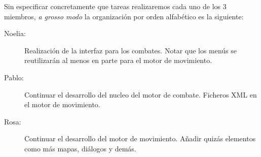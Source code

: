 \documentclass[a4paper,10pt]{article}
\begin{document}
\noindent Sin especificar concretamente que tareas realizaremos cada uno de
los 3 miembros, \textit{a grosso modo} la organización por orden alfabético
es la siguiente:

\begin{description}
\item[Noelia: ] Realización de la interfaz para los combates. Notar que
  los menús se reutilizarán al menos en parte para el motor de movimiento.
\item[Pablo: ] Continuar el desarrollo del nucleo del motor de combate. 
  Ficheros XML en el motor de movimiento.
\item[Rosa: ] Continuar el desarrollo del motor de movimiento. Añadir quizás
elementos como más mapas, diálogos y demás.
\end{description}
\end{document}

